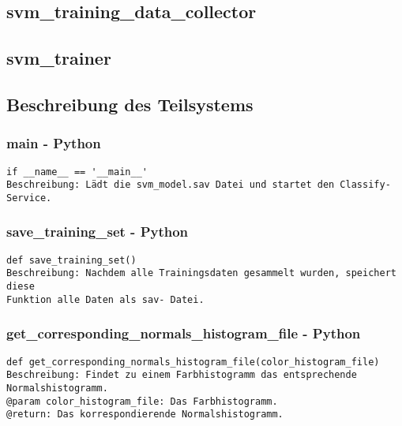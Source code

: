 \documentclass{suturo}
\begin{document}
\subsection{svm\_training\_data\_collector}
\begin{figure}[!htb]
\end{figure}

\subsection{svm\_trainer}
\begin{figure}[!htb]
\end{figure}
      
\subsection{Beschreibung des Teilsystems}

\subsubsection{main - Python}
\begin{verbatim}
if __name__ == '__main__'
Beschreibung: Lädt die svm_model.sav Datei und startet den Classify- Service.
\end{verbatim}

\subsubsection{save\_training\_set - Python}
\begin{verbatim}
def save_training_set()
Beschreibung: Nachdem alle Trainingsdaten gesammelt wurden, speichert diese 
Funktion alle Daten als sav- Datei.
\end{verbatim}

\subsubsection{get\_corresponding\_normals\_histogram\_file - Python}
\begin{verbatim}
def get_corresponding_normals_histogram_file(color_histogram_file)
Beschreibung: Findet zu einem Farbhistogramm das entsprechende Normalshistogramm. 
@param color_histogram_file: Das Farbhistogramm.
@return: Das korrespondierende Normalshistogramm.
\end{verbatim}
\end{document}
